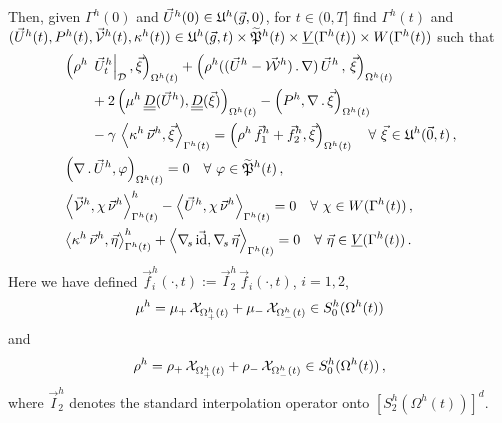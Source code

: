 Then, given $\Gamma^h(0)$ and $\vec U^h(0)\in \uspacesemidiscale{g}{h}{0}$, for
$t\in (0,T]$ find $\Gamma^h(t)$ and $(\vec U^h(t), P^h(t),
\V^h(t), \kappa^h(t)) \in \uspacesemidiscale{g}{h}{t} \times \pnormspaceale^h(t)
\times \Vht \times \Wht$ such that
\begin{subequations}
\begin{align}
& \left(\rho^h\,\left.\vec U^h_t\right|_{\D}, \vec \xi \right)_{\Omega^h(t)} +
\left(\rho^h((\vec U^h-\W^h)\,.\,\nabla)\,\vec U^h\,,
\,\vec \xi \right)_{\Omega^h(t)} \nonumber \\
& \qquad +2\left(\mu^h\,\mat D(\vec U^h), \mat D(\vec \xi) \right)_{\Omega^h(t)}
- \left(P^h, \nabla\,.\,\vec \xi\right)_{\Omega^h(t)} \nonumber \\
& \qquad - \gamma\,\left\langle \kappa^h\,\vec\nu^h,
\vec\xi\right\rangle_{\Gamma^h(t)} =
\left(\rho^h\,\vec f_1^h+\vec f_2^h, \vec \xi\right)_{\Omega^h(t)}
\quad \forall\ \vec\xi \in \uspacesemidiscale{0}{h}{t}\,,
\label{eq:ns_semi_alea}\\
& \left(\nabla\,.\,\vec U^h, \varphi\right)_{\Omega^h(t)}  = 0
\quad \forall\ \varphi \in \pnormspaceale^h(t)\,, \label{eq:ns_semi_aleb} \\
& \left\langle \V^h , \chi\,\vec\nu^h
\right\rangle_{\Gamma^h(t)}^h - \left\langle \vec U^h, \chi\,\vec\nu^h
\right\rangle_{\Gamma^h(t)} = 0 \quad \forall\ \chi \in \Wht\,,
\label{eq:ns_semi_alec} \\
& \left\langle \kappa^h\,\vec\nu^h, \vec\eta \right\rangle_{\Gamma^h(t)}^h
+ \left\langle \nabs\,\vec\id, \nabs\,\vec \eta \right\rangle_{\Gamma^h(t)} = 0
\quad \forall\ \vec\eta \in \Vht\,. \label{eq:ns_semi_aled}
\end{align}
\end{subequations}
Here we have defined
$\vec f_i^h(\cdot,t) := \vec I^h_2\,\vec f_i(\cdot,t)$, $i=1,2$,
\begin{equation}
\mu^h = \mu_+\,\charfcn{\Omega^h_+(t)} + \mu_-\,\charfcn{\Omega^h_-(t)}\in
S^h_0(\Omega^h(t))
\end{equation}
and
\begin{equation}
\rho^h = \rho_+\,\charfcn{\Omega^h_+(t)} + \rho_-\,\charfcn{\Omega^h_-(t)}\in
S^h_0(\Omega^h(t))\,,
\end{equation}
where $\vec I^h_2$ denotes the standard interpolation operator onto
$[S^h_2(\Omega^h(t))]^d$.

